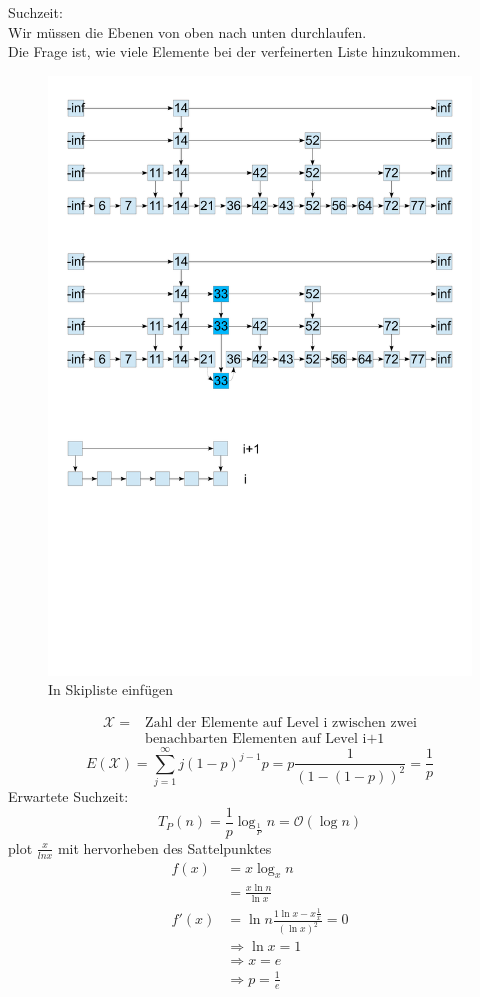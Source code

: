 \documentclass[a4paper,twoside,10pt]{report}
\begin{document}
Suchzeit:\\
Wir müssen die Ebenen von oben nach unten durchlaufen.\\
Die Frage ist, wie viele Elemente bei der verfeinerten Liste hinzukommen.\\
\begin{figure}[H]\center
\includegraphics[trim= .9cm 9cm 8.9cm 18cm,clip,width=.8\columnwidth]{figures/skiplist.pdf}
\caption{In Skipliste einfügen}
\end{figure}
\begin{align*}\mathcal X = &\mbox{Zahl der Elemente auf Level i zwischen zwei}\\&\mbox{benachbarten Elementen auf Level i+1}\end{align*}
\[E(\mathcal X)=\sum_{j=1}^\infty j(1-p)^{j-1}p=p\frac{1}{(1-(1-p))^2}=\frac{1}{p}\]
Erwartete Suchzeit:
\[T_P(n)=\frac{1}{p}\log_\frac{1}{P}n=\mathcal O (\log n)\]
plot $\frac{x}{ln x}$ mit hervorheben des Sattelpunktes
\begin{align*}
f(x)&=x\log_xn\\
&=\frac{x\ln n}{\ln x}\\
f'(x)&=\ln n \frac{1\ln x -x\frac{1}{x}}{(\ln x)^2}=0\\
&\Rightarrow \ln x = 1\\
&\Rightarrow x=e \\
&\Rightarrow p=\frac{1}{e}
\end{align*}
\end{document}
